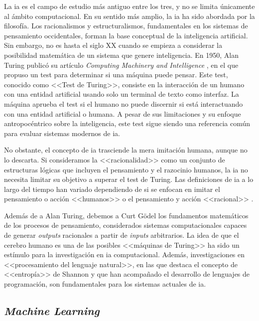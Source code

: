 La \gls{ia} es el campo de estudio más antiguo entre los tres, y no se limita únicamente al ámbito computacional. En su sentido más amplio, la \gls{ia} ha sido abordada por la filosofía. Los racionalismos y estructuralismos, fundamentales en los sistemas de pensamiento occidentales, forman la base conceptual de la inteligencia artificial. Sin embargo, no es hasta el siglo XX cuando se empieza a considerar la posibilidad matemática de un sistema que genere inteligencia. En 1950, Alan Turing publicó su artículo \textit{Computing Machinery and Intelligence} \citep{alan1950a}, en el que propuso un test para determinar si una máquina puede pensar. Este test, conocido como <<Test de Turing>>, consiste en la interacción de un humano con una entidad artificial usando solo un terminal de texto como interfaz. La máquina aprueba el test si el humano no puede discernir si está interactuando con una entidad artificial o humana. A pesar de sus limitaciones y su enfoque antropocéntrico sobre la inteligencia, este test sigue siendo una referencia común para evaluar sistemas modernos de \gls{ia}.

No obstante, el concepto de \gls{ia} trasciende la mera imitación humana, aunque no lo descarta. Si consideramos la <<racionalidad>> como un conjunto de estructuras lógicas que incluyen el pensamiento y el razocinio humanos, la \gls{ia} no necesita limitar su objetivo a superar el test de Turing. Las definiciones de \gls{ia} a lo largo del tiempo han variado dependiendo de si se enfocan en imitar el pensamiento o acción <<humanos>> o el pensamiento y acción <<racional>> \citep{RussellStuartJ2021AI:A}.

Además de a Alan Turing, debemos a Curt Gödel los fundamentos matemáticos de los procesos de pensamiento, considerados sistemas computacionales capaces de generar \textit{outputs} racionales a partir de \textit{inputs} arbitrarios. La idea de que el cerebro humano es una de las posibles <<máquinas de Turing>> \citep{penroseNuevaMenteEmperador2015} ha sido un estímulo para la investigación en \gls{ia} computacional. Además, investigaciones en <<procesamiento del lenguaje natural>>, en las que destaca el concepto de <<entropía>> de Shannon \citep{shannon1951prediction} y que han acompañado el desarrollo de lenguajes de programación, son fundamentales para los sistemas actuales de \gls{ia}.


\subsection{\textit{Machine Learning}}

